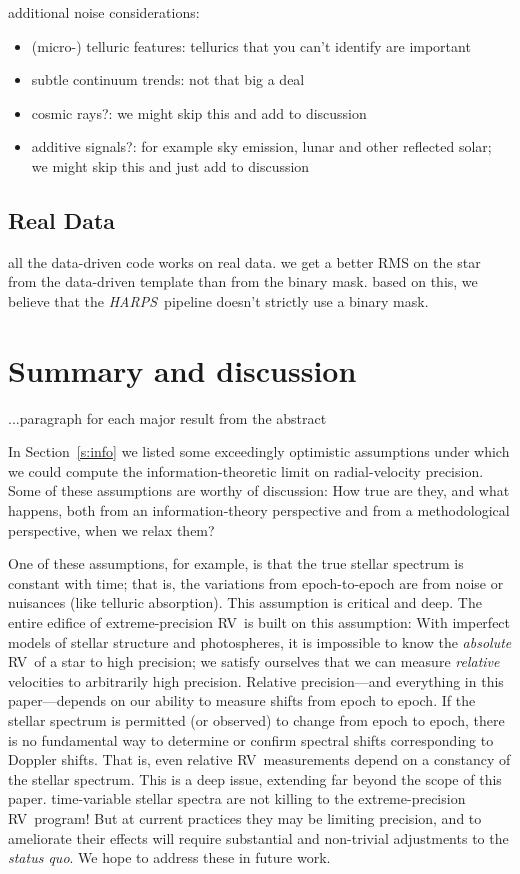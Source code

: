 \documentclass[modern]{aastex61}
\newcommand{\sectionname}{Section}
\newcommand{\acronym}[1]{{\small{#1}}}
\newcommand{\project}[1]{\textsl{#1}}
\newcommand{\foreign}[1]{\textsl{#1}}
\newcommand{\HARPS}{\project{\acronym{HARPS}}}
\newcommand{\RV}{\acronym{RV}}
\begin{document}
additional noise considerations:
\begin{itemize}
\item (micro-) telluric features: tellurics that you can't identify are important
\item subtle continuum trends: not that big a deal
\item cosmic rays?: we might skip this and add to discussion
\item additive signals?: for example sky emission, lunar and other reflected solar; we might skip this and just add to discussion
\end{itemize}

\subsection{Real Data}

all the data-driven code works on real data. we get a better RMS on the star from the data-driven template than from the binary mask. based on this, we believe that the \HARPS\ pipeline doesn't strictly use a binary mask.

\section{Summary and discussion}
\label{s:summary}

...paragraph for each major result from the abstract

In \sectionname~\ref{s:info} we listed some exceedingly
optimistic assumptions under which we could compute the
information-theoretic limit on radial-velocity precision.
Some of these assumptions are worthy of discussion: How true are they,
and what happens, both from an information-theory perspective and from
a methodological perspective, when we relax them?

One of these assumptions, for example, is that the true stellar
spectrum is constant with time; that is, the variations from
epoch-to-epoch are from noise or nuisances (like telluric absorption).
This assumption is critical and deep.
The entire edifice of extreme-precision \RV\ is built on this assumption:
With imperfect models of stellar structure and photospheres, it is
impossible to know the \emph{absolute} \RV\ of a star to high precision;
we satisfy ourselves that we can measure \emph{relative} velocities
to arbitrarily high precision.
Relative precision---and everything in this paper---depends on our
ability to measure shifts from epoch to epoch.
If the stellar spectrum is permitted (or observed) to change from epoch
to epoch, there is no fundamental way to determine or confirm spectral
shifts corresponding to Doppler shifts.
That is, even relative \RV\ measurements depend on a constancy of the
stellar spectrum.
This is a deep issue, extending far beyond the scope of this paper.
time-variable stellar spectra are not killing to the extreme-precision
\RV\ program!
But at current practices they may be limiting precision,
and to ameliorate their effects will require substantial and non-trivial adjustments to the
\foreign{status quo}.
We hope to address these in future work.
\end{document}

